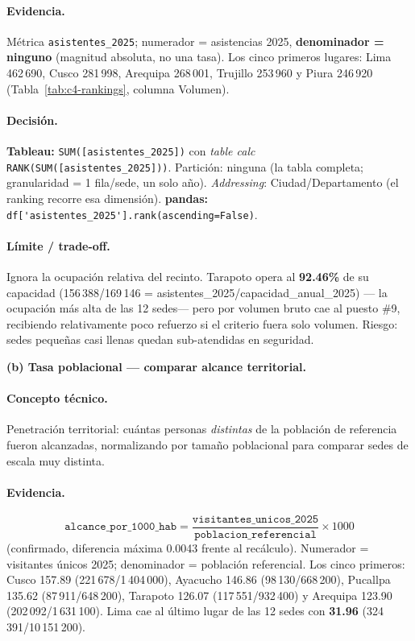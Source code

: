 \paragraph{Evidencia.} Métrica \texttt{asistentes\_2025}; numerador = asistencias 2025, \textbf{denominador = ninguno} (magnitud absoluta, no una tasa). Los cinco primeros lugares: Lima 462\,690, Cusco 281\,998, Arequipa 268\,001, Trujillo 253\,960 y Piura 246\,920 (Tabla~\ref{tab:c4-rankings}, columna Volumen).

\paragraph{Decisión.} \textbf{Tableau:} \lstinline{SUM([asistentes_2025])} con \emph{table calc} \lstinline{RANK(SUM([asistentes_2025]))}. Partición: ninguna (la tabla completa; granularidad = 1 fila/sede, un solo año). \emph{Addressing}: Ciudad/Departamento (el ranking recorre esa dimensión). \textbf{pandas:} \lstinline{df['asistentes_2025'].rank(ascending=False)}.

\paragraph{Límite / trade-off.} Ignora la ocupación relativa del recinto. Tarapoto opera al \textbf{92.46\%} de su capacidad (156\,388/169\,146 = asistentes\_2025/capacidad\_anual\_2025) --- la ocupación más alta de las 12 sedes--- pero por volumen bruto cae al puesto \#9, recibiendo relativamente poco refuerzo si el criterio fuera solo volumen. Riesgo: sedes pequeñas casi llenas quedan sub-atendidas en seguridad.

\textbf{(b) Tasa poblacional --- comparar alcance territorial.}

\paragraph{Concepto técnico.} Penetración territorial: cuántas personas \emph{distintas} de la población de referencia fueron alcanzadas, normalizando por tamaño poblacional para comparar sedes de escala muy distinta.

\paragraph{Evidencia.}
\[
\texttt{alcance\_por\_1000\_hab} = \frac{\texttt{visitantes\_unicos\_2025}}{\texttt{poblacion\_referencial}} \times 1000
\]
(confirmado, diferencia máxima 0.0043 frente al recálculo). Numerador = visitantes únicos 2025; denominador = población referencial. Los cinco primeros: Cusco 157.89 (221\,678/1\,404\,000), Ayacucho 146.86 (98\,130/668\,200), Pucallpa 135.62 (87\,911/648\,200), Tarapoto 126.07 (117\,551/932\,400) y Arequipa 123.90 (202\,092/1\,631\,100). Lima cae al último lugar de las 12 sedes con \textbf{31.96} (324\,391/10\,151\,200).

